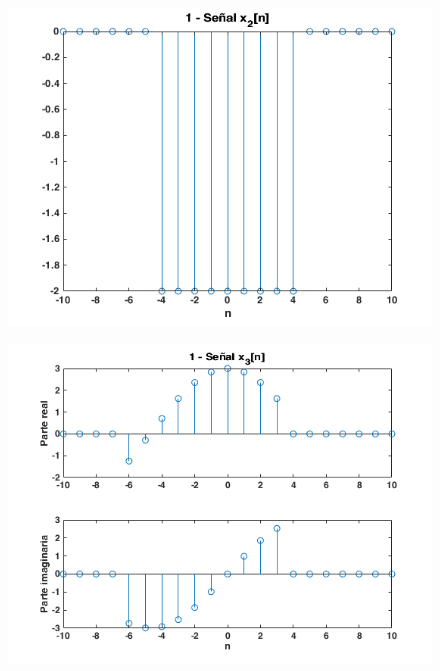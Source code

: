 \documentclass{article}
\begin{document}
\begin{figure}[h!] \caption[Figura 2]{}
	\centering
	\includegraphics[width=\linewidth]{./Figures/02.png}
\end{figure}

\begin{figure} \caption[Figura 3]{}
	\centering
	\includegraphics[width=\linewidth]{./Figures/03.png}
\end{figure}
\end{document}
